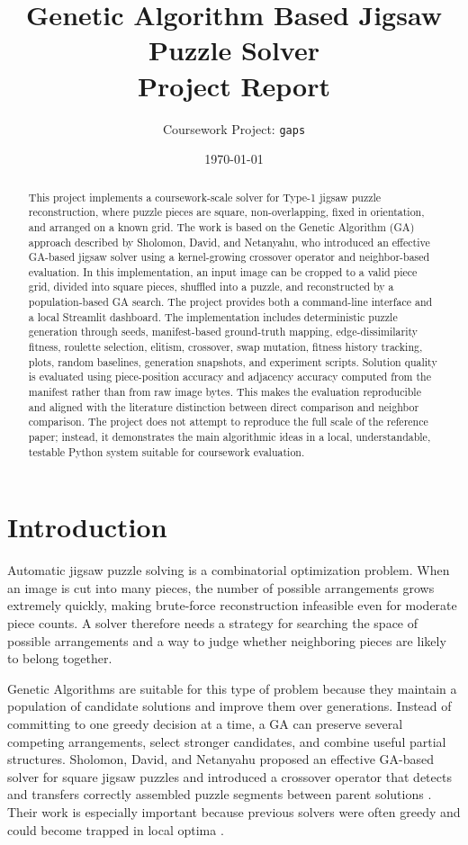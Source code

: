 \documentclass[12pt,a4paper]{article}
\title{\textbf{Genetic Algorithm Based Jigsaw Puzzle Solver}\\
\large Project Report}
\author{Coursework Project: \texttt{gaps}}
\date{\today}
\begin{document}
\maketitle

\begin{abstract}
This project implements a coursework-scale solver for Type-1 jigsaw puzzle reconstruction, where puzzle pieces are square, non-overlapping, fixed in orientation, and arranged on a known grid. The work is based on the Genetic Algorithm (GA) approach described by Sholomon, David, and Netanyahu, who introduced an effective GA-based jigsaw solver using a kernel-growing crossover operator and neighbor-based evaluation. In this implementation, an input image can be cropped to a valid piece grid, divided into square pieces, shuffled into a puzzle, and reconstructed by a population-based GA search. The project provides both a command-line interface and a local Streamlit dashboard. The implementation includes deterministic puzzle generation through seeds, manifest-based ground-truth mapping, edge-dissimilarity fitness, roulette selection, elitism, crossover, swap mutation, fitness history tracking, plots, random baselines, generation snapshots, and experiment scripts. Solution quality is evaluated using piece-position accuracy and adjacency accuracy computed from the manifest rather than from raw image bytes. This makes the evaluation reproducible and aligned with the literature distinction between direct comparison and neighbor comparison. The project does not attempt to reproduce the full scale of the reference paper; instead, it demonstrates the main algorithmic ideas in a local, understandable, testable Python system suitable for coursework evaluation.
\end{abstract}

\section{Introduction}
Automatic jigsaw puzzle solving is a combinatorial optimization problem. When an image is cut into many pieces, the number of possible arrangements grows extremely quickly, making brute-force reconstruction infeasible even for moderate piece counts. A solver therefore needs a strategy for searching the space of possible arrangements and a way to judge whether neighboring pieces are likely to belong together.

Genetic Algorithms are suitable for this type of problem because they maintain a population of candidate solutions and improve them over generations. Instead of committing to one greedy decision at a time, a GA can preserve several competing arrangements, select stronger candidates, and combine useful partial structures. Sholomon, David, and Netanyahu proposed an effective GA-based solver for square jigsaw puzzles and introduced a crossover operator that detects and transfers correctly assembled puzzle segments between parent solutions \cite{sholomon2016automatic}. Their work is especially important because previous solvers were often greedy and could become trapped in local optima \cite{pomeranz2011fully,gallagher2012jigsaw}.
\end{document}
